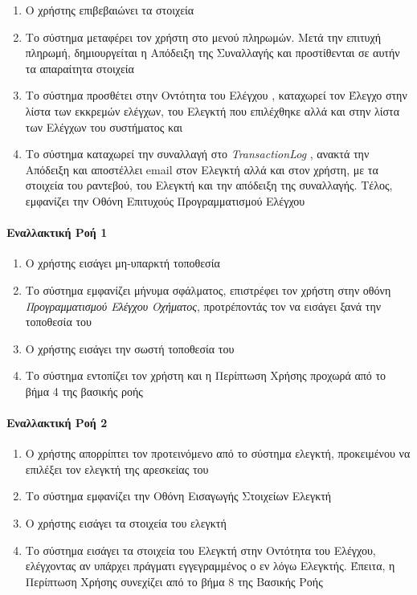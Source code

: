 \documentclass{../ol-softwaremanual}
\begin{document}
\begin{enumerate}
		\item Ο χρήστης επιβεβαιώνει τα στοιχεία
		\item Το σύστημα μεταφέρει τον χρήστη στο μενού πληρωμών. Μετά την επιτυχή πληρωμή, δημιουργείται η Απόδειξη της Συναλλαγής και προστίθενται σε αυτήν τα απαραίτητα στοιχεία
		\item Το σύστημα προσθέτει στην Οντότητα του Ελέγχου , καταχωρεί τον Έλεγχο στην λίστα των εκκρεμών ελέγχων, του Ελεγκτή που επιλέχθηκε αλλά και στην λίστα των Ελέγχων του συστήματος και 
		\item Το σύστημα καταχωρεί την συναλλαγή στο \en \textit{TransactionLog} \gr, ανακτά την Απόδειξη και αποστέλλει \en email \gr στον Ελεγκτή αλλά και στον χρήστη, με τα στοιχεία του ραντεβού, του Ελεγκτή και την απόδειξη της συναλλαγής. Τέλος, εμφανίζει την Οθόνη Επιτυχούς Προγραμματισμού Ελέγχου		
	\end{enumerate}
	
	
	
	\paragraph{Εναλλακτική Ροή 1}
	
	\begin{enumerate}
		\item Ο χρήστης εισάγει μη-υπαρκτή τοποθεσία
		\item Το σύστημα εμφανίζει μήνυμα σφάλματος, επιστρέφει τον χρήστη στην οθόνη \textit{Προγραμματισμού Ελέγχου Οχήματος}, προτρέποντάς τον να εισάγει ξανά την τοποθεσία του
		\item Ο χρήστης εισάγει την σωστή τοποθεσία του
		\item Το σύστημα εντοπίζει τον χρήστη και η Περίπτωση Χρήσης προχωρά από το βήμα 4 της βασικής ροής
	\end{enumerate}
	
	\paragraph{Εναλλακτική Ροή 2}
	
	\begin{enumerate}
		\item Ο χρήστης απορρίπτει τον προτεινόμενο από το σύστημα ελεγκτή, προκειμένου να επιλέξει τον ελεγκτή της αρεσκείας του
		\item Το σύστημα εμφανίζει την Οθόνη Εισαγωγής Στοιχείων Ελεγκτή
		\item Ο χρήστης εισάγει τα στοιχεία του ελεγκτή
		\item Το σύστημα εισάγει τα στοιχεία του Ελεγκτή στην Οντότητα του Ελέγχου, ελέγχοντας αν υπάρχει πράγματι εγγεγραμμένος ο εν λόγω Ελεγκτής. Έπειτα, η Περίπτωση Χρήσης συνεχίζει από το βήμα 8 της Βασικής Ροής
	\end{enumerate}	
	
\end{document}
